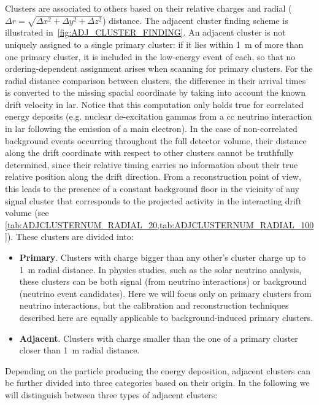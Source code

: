 Clusters are associated to others based on their relative charges and radial ($\Delta r = \sqrt{\Delta x^{2} + \Delta y^{2} + \Delta z^{2}}$) distance. The adjacent cluster finding scheme is illustrated in~\cref{fig:ADJ_CLUSTER_FINDING}. An adjacent cluster is not uniquely assigned to a single primary cluster: if it lies within \SI{1}{\meter} of more than one primary cluster, it is included in the low-energy event of each, so that no ordering-dependent assignment arises when scanning for primary clusters. For the radial distance comparison between clusters, the difference in their arrival times is converted to the missing spacial coordinate by taking into account the known drift velocity in \gls{lar}. Notice that this computation only holds true for correlated energy deposits (e.g. nuclear de-excitation gammas from a \gls{cc} neutrino interaction in \gls{lar} following the emission of a main electron). In the case of non-correlated background events occurring throughout the full detector volume, their distance along the drift coordinate with respect to other clusters cannot be truthfully determined, since their relative timing carries no information about their true relative position along the drift direction. From a reconstruction point of view, this leads to the presence of a constant background floor in the vicinity of any signal cluster that corresponds to the projected activity in the interacting drift volume (see \cref{tab:ADJCLUSTERNUM_RADIAL_20,tab:ADJCLUSTERNUM_RADIAL_100}). These clusters are divided into:

\begin{itemize}
    \item \textbf{Primary}. Clusters with charge bigger than any other's cluster charge up to \SI{1}{\meter} radial distance. In physics studies, such as the solar neutrino analysis, these clusters can be both signal (from neutrino interactions) or background (neutrino event candidates). Here we will focus only on primary clusters from neutrino interactions, but the calibration and reconstruction techniques described here are equally applicable to background-induced primary clusters.
    \item \textbf{Adjacent}. Clusters with charge smaller than the one of a primary cluster closer than \SI{1}{\meter} radial distance.
\end{itemize}

Depending on the particle producing the energy deposition, adjacent clusters can be further divided into three categories based on their origin. In the following we will distinguish between three types of adjacent clusters:

